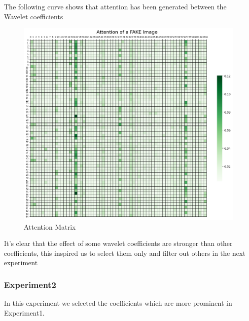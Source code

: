 \documentclass{svproc}
\begin{document}
\noindent
The following curve shows that attention has been generated between the Wavelet coefficients
\begin{figure}[H]
  \centering
    \includegraphics[width=0.7\linewidth]{figures/exp1_attn_fake.png}
    \caption{Attention Matrix }
    \label{fig:attn_fake}
\end{figure}
\noindent
It's clear that the effect of some wavelet coefficients are stronger than other coefficients, this inspired us to select them only and filter out others in the next experiment  
\subsubsection{Experiment2}
In this experiment we selected the coefficients which are more prominent in Experiment1.
\end{document}

